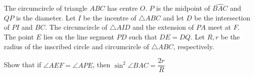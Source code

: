 The circumcircle of triangle $ABC$ has centre $O$. $P$ is the midpoint of $\widehat{BAC}$ and $QP$ is the diameter. Let $I$ be the incentre of $\triangle ABC$ and let $D$ be the intersection of $PI$ and $BC$. The circumcircle of $\triangle AID$ and the extension of $PA$ meet at $F$. The point $E$ lies on the line segment $PD$ such that $DE=DQ$. Let $R,r$ be the radius of the inscribed circle and circumcircle of $\triangle ABC$,  respectively.

Show that if $\angle AEF=\angle APE$,  then $\sin^2\angle BAC=\dfrac{2r}R$